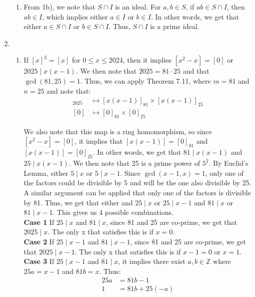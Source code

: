 \documentclass{article}
\begin{document}
\begin{enumerate}
\begin{enumerate}
    \item
    From 1b), we note that $S \cap I$ is an ideal. For $a, b \in S$, if $ab \in S \cap I$, then $ab \in I$, which implies either $a \in I$ or $b \in I$. In other words, we get that either $a \in S \cap I$ or $b \in S \cap I$. Thus, $S \cap I$ is a prime ideal.
\end{enumerate}

\newpage 

\item
\begin{enumerate}
    \item 
    If $[x]^2 = [x]$ for $0 \leq x \leq 2024$, then it implies $[x^2 - x] = [0]$ or $2025 \mid x(x-1)$. We then note that $2025 = 81 \cdot 25$ and that $\gcd(81, 25) = 1$. Thus, we can apply Theorem 7.11, where $m = 81$ and $n = 25$ and note that: 
    \begin{align*}
        [x(x-1)]_{2025} &\mapsto [x(x-1)]_{81} \times [x(x-1)]_{25}\\
        [0] &\mapsto [0]_{81} \times [0]_{25}
    \end{align*}

    We also note that this map is a ring homomorphism, so since $[x^2 - x] = [0]$, it implies that $[x(x-1)] = [0]_{81}$ and $[x(x-1)] = [0]_{25}$. In other words, we get that $81 \mid x(x-1)$ and $25 \mid x(x-1)$. We then note that 25 is a prime power of $5^2$. By Euclid's Lemma, either $5 \mid x$ or $5 \mid x - 1$. Since $\gcd(x - 1, x) = 1$, only one of the factors could be divisible by 5 and will be the one also divisible by 25. A similar argument can be applied that only one of the factors is divisible by 81. Thus, we get that either and $25 \mid x$ or $25 \mid x - 1$ and $81 \mid x$ or $81 \mid x - 1$. This gives us 4 possible combinations. \\

    \textbf{Case 1} If $25 \mid x$ and $81 \mid x$, since 81 and 25 are co-prime, we get that $2025 \mid x$. The only x that satisfies this is if $x = 0$. \\

    \textbf{Case 2} If $25 \mid x-1$ and $81 \mid x-1$, since 81 and 25 are co-prime, we get that $2025 \mid x-1$. The only x that satisfies this is if $x - 1 = 0$ or $x = 1$. \\

    \textbf{Case 3} If $25 \mid x-1$ and $81 \mid x$, it implies there exist $a, b \in \mathbb{Z}$ where $25a = x-1$ and $81b = x$. Thus: 
    \begin{align*}
        25a &= 81b - 1 \\
        1 &= 81b + 25(-a)
    \end{align*}


\end{enumerate}
\end{enumerate}
\end{document}
